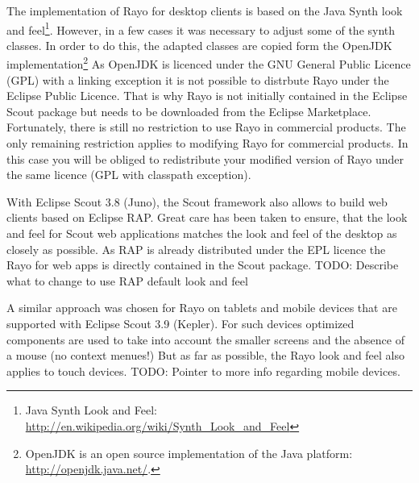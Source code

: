 \documentclass[a4paper,10pt,twoside]{book}
\begin{document}
The implementation of Rayo for desktop clients is based on the Java Synth look and feel\footnote{
Java Synth Look and Feel: \url{http://en.wikipedia.org/wiki/Synth_Look_and_Feel}
}.
However, in a few cases it was necessary to adjust some of the synth classes. 
In order to do this, the adapted classes are copied form the OpenJDK implementation\footnote{
OpenJDK is an open source implementation of the Java platform: \url{http://openjdk.java.net/}.
}
As OpenJDK is licenced under the GNU General Public Licence (GPL) with a linking exception it is not possible to distrbute Rayo under the Eclipse Public Licence.
That is why Rayo is not initially contained in the Eclipse Scout package but needs to be downloaded from the Eclipse Marketplace.
Fortunately, there is still no restriction to use Rayo in commercial products.
The only remaining restriction applies to modifying Rayo for commercial products.
In this case you will be obliged to redistribute your modified version of Rayo under the same licence (GPL with classpath exception).

With Eclipse Scout 3.8 (Juno), the Scout framework also allows to build web clients based on Eclipse RAP.
Great care has been taken to ensure, that the look and feel for Scout web applications matches the look and feel of the desktop as closely as possible.
As RAP is already distributed under the EPL licence the Rayo for web apps is directly contained in the Scout package.
TODO: Describe what to change to use RAP default look and feel

A similar approach was chosen for Rayo on tablets and mobile devices that are supported with Eclipse Scout 3.9 (Kepler).
For such devices optimized components are used to take into account the smaller screens and the absence of a mouse (no context menues!)
But as far as possible, the Rayo look and feel also applies to touch devices.
TODO: Pointer to more info regarding mobile devices.

\end{document}
